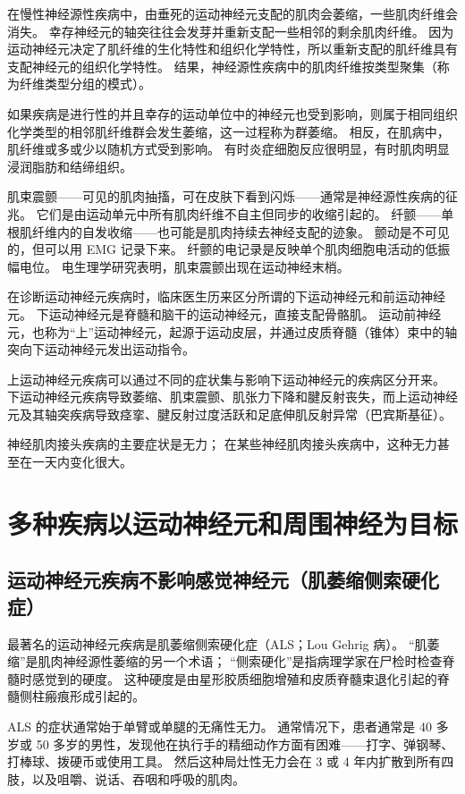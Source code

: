 在慢性神经源性疾病中，由垂死的运动神经元支配的肌肉会萎缩，一些肌肉纤维会消失。 幸存神经元的轴突往往会发芽并重新支配一些相邻的剩余肌肉纤维。 因为运动神经元决定了肌纤维的生化特性和组织化学特性，所以重新支配的肌纤维具有支配神经元的组织化学特性。 结果，神经源性疾病中的肌肉纤维按类型聚集（称为纤维类型分组的模式）。

如果疾病是进行性的并且幸存的运动单位中的神经元也受到影响，则属于相同组织化学类型的相邻肌纤维群会发生萎缩，这一过程称为群萎缩。 相反，在肌病中，肌纤维或多或少以随机方式受到影响。 有时炎症细胞反应很明显，有时肌肉明显浸润脂肪和结缔组织。

肌束震颤——可见的肌肉抽搐，可在皮肤下看到闪烁——通常是神经源性疾病的征兆。 它们是由运动单元中所有肌肉纤维不自主但同步的收缩引起的。 纤颤——单根肌纤维内的自发收缩——也可能是肌肉持续去神经支配的迹象。 颤动是不可见的，但可以用 EMG 记录下来。 纤颤的电记录是反映单个肌肉细胞电活动的低振幅电位。 电生理学研究表明，肌束震颤出现在运动神经末梢。

在诊断运动神经元疾病时，临床医生历来区分所谓的下运动神经元和前运动神经元。 下运动神经元是脊髓和脑干的运动神经元，直接支配骨骼肌。 运动前神经元，也称为“上”运动神经元，起源于运动皮层，并通过皮质脊髓（锥体）束中的轴突向下运动神经元发出运动指令。

上运动神经元疾病可以通过不同的症状集与影响下运动神经元的疾病区分开来。 下运动神经元疾病导致萎缩、肌束震颤、肌张力下降和腱反射丧失，而上运动神经元及其轴突疾病导致痉挛、腱反射过度活跃和足底伸肌反射异常（巴宾斯基征）。

神经肌肉接头疾病的主要症状是无力； 在某些神经肌肉接头疾病中，这种无力甚至在一天内变化很大。


\section{多种疾病以运动神经元和周围神经为目标}


\subsection{运动神经元疾病不影响感觉神经元（肌萎缩侧索硬化症）}
最著名的运动神经元疾病是肌萎缩侧索硬化症（ALS；Lou Gehrig 病）。 “肌萎缩”是肌肉神经源性萎缩的另一个术语； “侧索硬化”是指病理学家在尸检时检查脊髓时感觉到的硬度。 这种硬度是由星形胶质细胞增殖和皮质脊髓束退化引起的脊髓侧柱瘢痕形成引起的。

ALS 的症状通常始于单臂或单腿的无痛性无力。 通常情况下，患者通常是 40 多岁或 50 多岁的男性，发现他在执行手的精细动作方面有困难——打字、弹钢琴、打棒球、拨硬币或使用工具。 然后这种局灶性无力会在 3 或 4 年内扩散到所有四肢，以及咀嚼、说话、吞咽和呼吸的肌肉。

